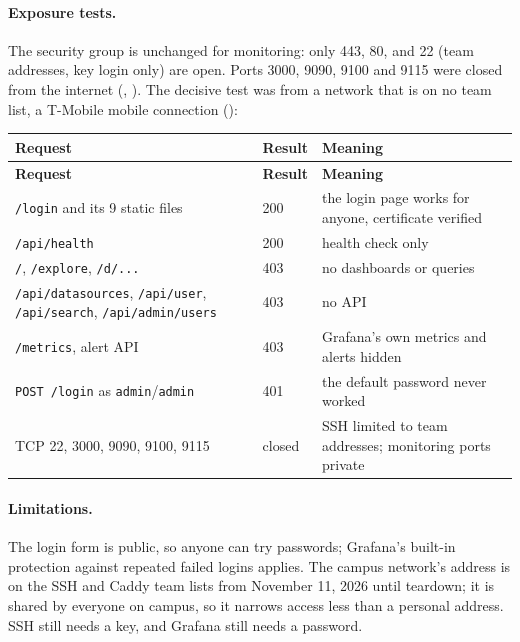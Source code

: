 \paragraph{Exposure tests.} The security group is unchanged for monitoring: only 443, 80, and 22 (team addresses, key
login only) are open. Ports 3000, 9090, 9100 and 9115 were closed from the internet (, ).
The decisive test was from a network that is on no team list, a T-Mobile mobile connection ():

\begin{tabularx}{\linewidth}{L{5.6cm}L{2.0cm}Y}
\caption{Grafana from a non-team network, November 11, 2026\label{Table:SreOutside}}\\
\toprule \textbf{Request} & \textbf{Result} & \textbf{Meaning}\\ \midrule
\endfirsthead
\toprule \textbf{Request} & \textbf{Result} & \textbf{Meaning}\\ \midrule
\endhead \bottomrule \endlastfoot
\texttt{/login} and its 9 static files & 200 & the login page works for anyone, certificate verified\\
\texttt{/api/health} & 200 & health check only\\
\texttt{/}, \texttt{/explore}, \texttt{/d/...} & 403 & no dashboards or queries\\
\texttt{/api/datasources}, \texttt{/api/user}, \texttt{/api/search}, \texttt{/api/admin/users} & 403 & no API\\
\texttt{/metrics}, alert API & 403 & Grafana's own metrics and alerts hidden\\
\texttt{POST /login} as \texttt{admin}/\texttt{admin} & 401 & the default password never worked\\
TCP 22, 3000, 9090, 9100, 9115 & closed & SSH limited to team addresses; monitoring ports private\\
\end{tabularx}

\paragraph{Limitations.} The login form is public, so anyone can try passwords; Grafana's built-in protection against
repeated failed logins applies. The campus network's address is on the SSH and Caddy team lists from November 11, 2026
until teardown; it is shared by everyone on campus, so it narrows access less than a personal address. SSH still needs a
key, and Grafana still needs a password.

